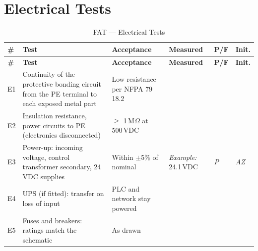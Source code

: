 \section{Electrical Tests}
\begin{small}
\begin{longtable}{@{}|P{0.76cm}|P{5.11cm}|P{3.49cm}|P{3.54cm}|P{1.09cm}|P{1.15cm}|@{}}
\caption{FAT --- Electrical Tests}\label{tab:fat-electrical} \\
\hline
{}\textbf{\#} & \textbf{Test} & \textbf{Acceptance} & \textbf{Measured} & \textbf{P/F} & \textbf{Init.} \\ \hline
\endfirsthead
\hline
{}\textbf{\#} & \textbf{Test} & \textbf{Acceptance} & \textbf{Measured} & \textbf{P/F} & \textbf{Init.} \\ \hline
\endhead
E1 & Continuity of the protective bonding circuit from the PE terminal to each exposed metal part & Low resistance per NFPA 79 18.2 & & & \\ \hline
E2 & Insulation resistance, power circuits to PE (electronics disconnected) & $\geq$ 1\,M$\Omega$ at 500\,VDC & & & \\ \hline
E3 & Power-up: incoming voltage, control transformer secondary, 24\,VDC supplies & Within $\pm$5\% of nominal & \textit{Example:} 24.1\,VDC & \textit{P} & \textit{AZ} \\ \hline
E4 & UPS (if fitted): transfer on loss of input & PLC and network stay powered & & & \\ \hline
E5 & Fuses and breakers: ratings match the schematic & As drawn & & & \\ \hline
\end{longtable}
\end{small}

